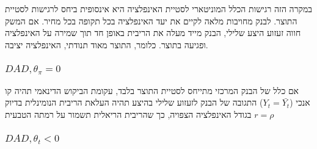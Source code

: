 \documentclass[usenames,dvipsnames]{beamer}
\begin{document}
\begin{RTL}
\begin{frame}
\begin{center}
    \end{center}
    במקרה הזה רגישות הכלל
המוניטארי לסטיית האינפלציה
היא אינסופית ביחס לרגישות
לסטיית התוצר. לבנק מחויבות
מלאה לקיים את יעד האינפלציה
בכל תקופה בכל מחיר. אם
המשק חווה זעזוע היצע שלילי,
הבנק מייד מעלה את הריבית
באופן חד תוך שמירה על
האינפלציה ופגיעה בתוצר. כלומר,
התוצר מאוד תנודתי, האינפלציה
יציבה.
    

\end{frame}
\begin{frame}
    \frametitle{$DAD, \theta_\pi = 0 $}
    \begin{center}
          
    \end{center}
    אם כלל של הבנק המרכזי מתייחס לסטיית התוצר בלבד, עקומת הביקוש הדינאמי תהיה קו אנכי ($Y_t = \bar{Y_t}$) התגובה של הבנק לזעזוע שלילי בהיצע תהיה העלאת הריבית הנומינלית בדיוק בגודל האינפלציה הצפויה, כך שהריבית הריאלית תשמור על רמתה הטבעית $r = \rho$

    

\end{frame}

\begin{frame}
    \frametitle{$DAD , \theta_t < 0$}
    \begin{center}
\end{center}
\end{frame}
\end{RTL}
\end{document}
